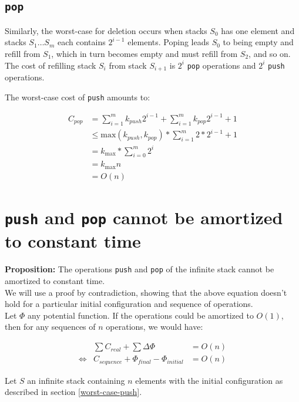   \subsection{\texttt{pop}}
  Similarly, the worst-case for deletion occurs when stacks $S_0$ has one element and stacks $S_1\ldots S_m$ each contains $2^{i-1}$ elements. Poping leads $S_0$ to being empty and refill from $S_1$, which in turn becomes empty and must refill from $S_2$, and so on. The cost of refilling stack $S_i$ from stack $S_{i+1}$ is $2^i$ \texttt{pop} operations and $2^i$ \texttt{push} operations.

  The worst-case cost of \texttt{push} amounts to:

  \[
  \begin{array}{ll}
    C_{pop} & = \sum_{i=1}^m k_{push} 2^{i-1} + \sum_{i=1}^m k_{pop} 2^{i-1} + 1\\
            & \leq \text{max}(k_{push}, k_{pop}) * \sum_{i=1}^m 2 * 2^{i-1} + 1\\
            & = k_{\text{max}} * \sum_{i=0}^m 2^{i}\\
            & = k_{\text{max}} n\\
            & = O(n)
  \end{array}
  \]

\section{\texttt{push} and \texttt{pop} cannot be amortized to constant time}

\textbf{Proposition:} The operations \texttt{push} and \texttt{pop} of the infinite stack cannot be amortized to constant time.\\

We will use a proof by contradiction, showing that the above equation doesn't hold for a particular initial configuration and sequence of operations.\\

Let $\Phi$ any potential function. If the operations could be amortized to $O(1)$, then for any sequences of $n$ operations, we would have:

\[
\begin{array}{lrcl}
  & \sum C_{real} + \sum \Delta\Phi & = O(n) \\
  \iff & C_{sequence} + \Phi_{final} - \Phi_{initial} & = O(n)
\end{array}
\]

Let $S$ an infinite stack containing $n$ elements with the initial configuration as described in section \ref{worst-case-push}.\\

